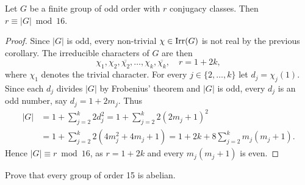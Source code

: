 \begin{theorem}[Burnside]
  \label{thm:Burnside_mod16}
  Let $G$ be a finite group of odd order 
  with $r$ conjugacy classes. Then
  $r\equiv|G|\bmod{16}$.
\end{theorem}

\begin{proof}
  Since $|G|$ is odd, every non-trivial $\chi\in\operatorname{Irr}(G)$ is not real by
  the previous corollary. The irreducible characters 
  of $G$ are then 
  \[
    \chi_1,\chi_2,\overline{\chi_2},\dots,\chi_k,\overline{\chi_k},
    \quad
    r=1+2k,
  \]
  where $\chi_1$ denotes the trivial character. 
  For every $j\in\{2,\dots,k\}$ let $d_j=\chi_j(1)$. 
  Since each $d_j$ divides 
  $|G|$ by Frobenius' theorem and  $|G|$ is odd, 
  every $d_j$ is an odd number, 
  say $d_j=1+2m_j$. Thus  
  \begin{align*}
    |G|&=1+\sum_{j=2}^k 2d_j^2=1+\sum_{j=2}^k2(2m_j+1)^2\\
    &=1+\sum_{j=2}^k2(4m_j^2+4m_j+1)
    =1+2k+8\sum_{j=2}^km_j(m_j+1).
  \end{align*}
  Hence $|G|\equiv r\bmod{16}$, 
  as $r=1+2k$ and every $m_j(m_j+1)$ is even. 
\end{proof}

\begin{exercise}
    Prove that every group of order 15 is abelian. 
\end{exercise}

